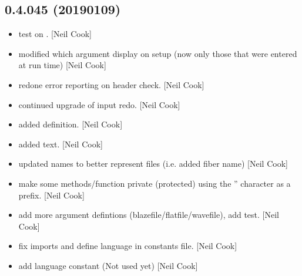 \documentclass[a4paper,10pt,english]{report}
\begin{document}
\subsection{0.4.045 (2019\sphinxhyphen{}01\sphinxhyphen{}09)}
\label{\detokenize{misc/changelog:id239}}\begin{itemize}
\item {} 
 \sphinxhyphen{} test on . {[}Neil Cook{]}

\item {} 
 \sphinxhyphen{} modified which argument display on setup (now only
those that were entered at run time) {[}Neil Cook{]}

\item {} 
 \sphinxhyphen{} redone error reporting on header check. {[}Neil Cook{]}

\item {} 
 \sphinxhyphen{} continued upgrade of input redo. {[}Neil Cook{]}

\item {} 
 \sphinxhyphen{} added  definition. {[}Neil Cook{]}

\item {} 
 \sphinxhyphen{} added  text. {[}Neil Cook{]}

\item {} 
 \sphinxhyphen{} updated names to better represent files (i.e. added
fiber name) {[}Neil Cook{]}

\item {} 
 \sphinxhyphen{} make some methods/function private (protected) using
the ” character as a prefix. {[}Neil Cook{]}

\item {} 
 \sphinxhyphen{} add more argument defintions
(blazefile/flatfile/wavefile), add  test. {[}Neil Cook{]}

\item {} 
 \sphinxhyphen{} fix imports and define language in constants
file. {[}Neil Cook{]}

\item {} 
 \sphinxhyphen{} add language constant (Not used yet) {[}Neil Cook{]}


\end{itemize}
\end{document}
